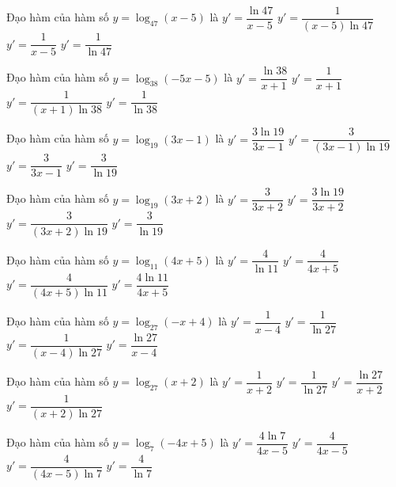\documentclass[12pt,a4paper]{article}
\begin{document}
\begin{ex}
Đạo hàm của hàm số $y=\log_{47}(x-5)$ là
\choice
{$y'=\dfrac{\ln{47}}{x-5}$}
{\True $y'=\dfrac{1}{(x-5)\ln 47}$}
{$y'=\dfrac{1}{x-5}$}
{$y'=\dfrac{1}{\ln{47}}$}
\end{ex}
\begin{ex}
Đạo hàm của hàm số $y=\log_{38}(-5x-5)$ là
\choice
{$y'=\dfrac{\ln{38}}{x+1}$}
{$y'=\dfrac{1}{x+1}$}
{\True $y'=\dfrac{1}{(x+1)\ln 38}$}
{$y'=\dfrac{1}{\ln{38}}$}
\end{ex}
\begin{ex}
Đạo hàm của hàm số $y=\log_{19}(3x-1)$ là
\choice
{$y'=\dfrac{3\ln{19}}{3x-1}$}
{\True $y'=\dfrac{3}{(3x-1)\ln 19}$}
{$y'=\dfrac{3}{3x-1}$}
{$y'=\dfrac{3}{\ln{19}}$}
\end{ex}
\begin{ex}
Đạo hàm của hàm số $y=\log_{19}(3x+2)$ là
\choice
{$y'=\dfrac{3}{3x+2}$}
{$y'=\dfrac{3\ln{19}}{3x+2}$}
{\True $y'=\dfrac{3}{(3x+2)\ln 19}$}
{$y'=\dfrac{3}{\ln{19}}$}
\end{ex}
\begin{ex}
Đạo hàm của hàm số $y=\log_{11}(4x+5)$ là
\choice
{$y'=\dfrac{4}{\ln{11}}$}
{$y'=\dfrac{4}{4x+5}$}
{\True $y'=\dfrac{4}{(4x+5)\ln 11}$}
{$y'=\dfrac{4\ln{11}}{4x+5}$}
\end{ex}
\begin{ex}
Đạo hàm của hàm số $y=\log_{27}(-x+4)$ là
\choice
{$y'=\dfrac{1}{x-4}$}
{$y'=\dfrac{1}{\ln{27}}$}
{\True $y'=\dfrac{1}{(x-4)\ln 27}$}
{$y'=\dfrac{\ln{27}}{x-4}$}
\end{ex}
\begin{ex}
Đạo hàm của hàm số $y=\log_{27}(x+2)$ là
\choice
{$y'=\dfrac{1}{x+2}$}
{$y'=\dfrac{1}{\ln{27}}$}
{$y'=\dfrac{\ln{27}}{x+2}$}
{\True $y'=\dfrac{1}{(x+2)\ln 27}$}
\end{ex}
\begin{ex}
Đạo hàm của hàm số $y=\log_7(-4x+5)$ là
\choice
{$y'=\dfrac{4\ln{7}}{4x-5}$}
{$y'=\dfrac{4}{4x-5}$}
{\True $y'=\dfrac{4}{(4x-5)\ln 7}$}
{$y'=\dfrac{4}{\ln{7}}$}
\end{ex}
\end{document}
